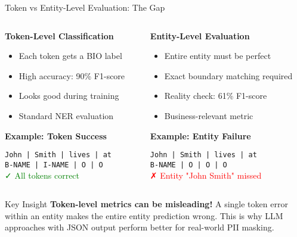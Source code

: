 \documentclass[aspectratio=169]{beamer}
\begin{document}
\begin{frame}{Token vs Entity-Level Evaluation: The Gap}
\begin{columns}
\begin{column}{0.5\textwidth}
\textbf{Token-Level Classification}
\begin{itemize}
\item Each token gets a BIO label
\item High accuracy: 90\% F1-score
\item Looks good during training
\item Standard NER evaluation
\end{itemize}

\vspace{0.3cm}
\textbf{Example: Token Success}
\begin{center}
\texttt{John | Smith | lives | at}\\
\texttt{B-NAME | I-NAME | O | O}\\
\textcolor{green}{✓ All tokens correct}
\end{center}
\end{column}
\begin{column}{0.5\textwidth}
\textbf{Entity-Level Evaluation}
\begin{itemize}
\item Entire entity must be perfect
\item Exact boundary matching required
\item Reality check: 61\% F1-score
\item Business-relevant metric
\end{itemize}

\vspace{0.3cm}
\textbf{Example: Entity Failure}
\begin{center}
\texttt{John | Smith | lives | at}\\
\texttt{B-NAME | O | O | O}\\
\textcolor{red}{✗ Entity "John Smith" missed}
\end{center}
\end{column}
\end{columns}

\vspace{0.5cm}
\begin{alertblock}{Key Insight}
\textbf{Token-level metrics can be misleading!} A single token error within an entity makes the entire entity prediction wrong. This is why LLM approaches with JSON output perform better for real-world PII masking.
\end{alertblock}
\end{frame}
\end{document}
